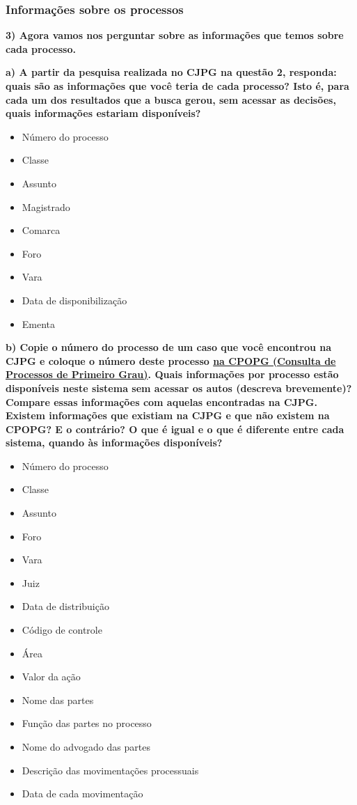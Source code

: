 \documentclass[
  letterpaper,
  DIV=11,
  numbers=noendperiod]{scrartcl}
\providecommand{\tightlist}{%
  \setlength{\itemsep}{0pt}\setlength{\parskip}{0pt}}\usepackage{longtable,booktabs,array}
\begin{document}
\hypertarget{informauxe7uxf5es-sobre-os-processos}{%
\subsubsection{Informações sobre os
processos}\label{informauxe7uxf5es-sobre-os-processos}}

\textbf{3) Agora vamos nos perguntar sobre as informações que temos
sobre cada processo.}

\textbf{a) A partir da pesquisa realizada no CJPG na questão 2,
responda: quais são as informações que você teria de cada processo? Isto
é, para cada um dos resultados que a busca gerou, sem acessar as
decisões, quais informações estariam disponíveis?}

\begin{itemize}
\tightlist
\item
  Número do processo
\item
  Classe
\item
  Assunto
\item
  Magistrado
\item
  Comarca
\item
  Foro
\item
  Vara
\item
  Data de disponibilização
\item
  Ementa
\end{itemize}

\textbf{b) Copie o número do processo de um caso que você encontrou na
CJPG e coloque o número deste processo
\href{https://esaj.tjsp.jus.br/cpopg/open.do}{na CPOPG (Consulta de
Processos de Primeiro Grau)}. Quais informações por processo estão
disponíveis neste sistema sem acessar os autos (descreva brevemente)?
Compare essas informações com aquelas encontradas na CJPG. Existem
informações que existiam na CJPG e que não existem na CPOPG? E o
contrário? O que é igual e o que é diferente entre cada sistema, quando
às informações disponíveis?}

\begin{itemize}
\tightlist
\item
  Número do processo
\item
  Classe
\item
  Assunto
\item
  Foro
\item
  Vara
\item
  Juiz
\item
  Data de distribuição
\item
  Código de controle
\item
  Área
\item
  Valor da ação
\item
  Nome das partes
\item
  Função das partes no processo
\item
  Nome do advogado das partes
\item
  Descrição das movimentações processuais
\item
  Data de cada movimentação
\end{itemize}
\end{document}
